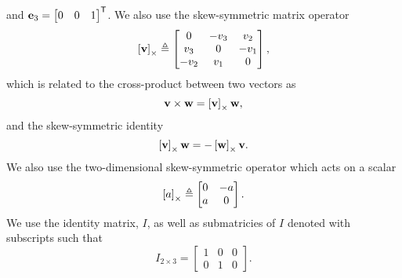 and $\boldsymbol{\mathrm{e}}_3 = \begin{bmatrix} 0 & 0 & 1 \end{bmatrix}^{\mathsf{T}}$.
We also use the skew-symmetric matrix operator
\begin{equation}
  \left[ \boldsymbol{\mathrm{v}} \right]_{\times} \triangleq
  \begin{bmatrix}
  0 & -v_{3} & v_{2}\\
  v_{3} & 0 & -v_{1}\\
  -v_{2} & v_{1} & 0
  \end{bmatrix},
\end{equation}
which is related to the cross-product between two vectors as
\begin{equation}
  \boldsymbol{\mathrm{v}}\times\boldsymbol{\mathrm{w}}=\left[ \boldsymbol{\mathrm{v}} \right]_{\times}\boldsymbol{\mathrm{w}},
\end{equation}
and the skew-symmetric identity
\begin{equation}
  \left[ \boldsymbol{\mathrm{v}} \right]_{\times} \boldsymbol{\mathrm{w}} = -\left[ \boldsymbol{\mathrm{w}} \right]_{\times} \boldsymbol{\mathrm{v}}.
\end{equation}
We also use the two-dimensional skew-symmetric operator which acts on a scalar
\begin{equation}
  \left[ a \right]_{\times} \triangleq
  \begin{bmatrix}
  0 & -a \\
  a & 0
  \end{bmatrix}.
\end{equation}
We use the identity matrix, $I$, as well as submatricies of $I$ denoted with
subscripts such that
\begin{equation}
  I_{2 \times 3} =
  \begin{bmatrix}
    1 & 0 & 0 \\
    0 & 1 & 0
  \end{bmatrix}.
\end{equation}
